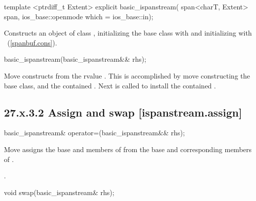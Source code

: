 \documentclass[ebook,11pt,article]{memoir}
\begin{document}
\begin{itemdecl}
template <ptrdiff_t Extent>
explicit basic_ispanstream(
  span<charT, Extent> span,
  ios_base::openmode which = ios_base::in);
\end{itemdecl}

\begin{itemdescr}
\pnum
\effects
Constructs an object of class
,
initializing the base class with
and initializing  with
~(\ref{spanbuf.cons}).
\end{itemdescr}

\begin{itemdecl}
basic_ispanstream(basic_ispanstream&& rhs);
\end{itemdecl}

\begin{itemdescr}
\pnum
\effects Move constructs from the rvalue . This
is accomplished by move constructing the base class, and the contained
.
Next  is called to
install the contained .
\end{itemdescr}

\subsection{27.x.3.2 Assign and swap [ispanstream.assign]}
\label{ispanstream.assign}

\begin{itemdecl}
basic_ispanstream& operator=(basic_ispanstream&& rhs);
\end{itemdecl}

\begin{itemdescr}
\pnum
\effects Move assigns the base and members of  from the base and corresponding
members of .

\pnum
\returns {}.
\end{itemdescr}

\begin{itemdecl}
void swap(basic_ispanstream& rhs);
\end{itemdecl}
\end{document}
